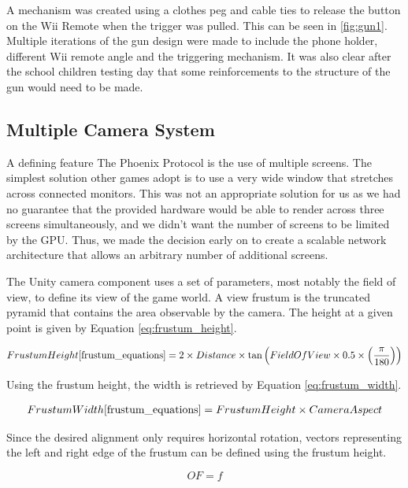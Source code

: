 \documentclass[a4paper,11pt]{article}
\begin{document}
A mechanism was created using a clothes peg and cable ties to release the button on the Wii Remote when the trigger was pulled. This can be seen in \ref{fig:gun1}. Multiple iterations of the gun design were made to include the phone holder, different Wii remote angle and the triggering mechanism. It was also clear after the school children testing day that some reinforcements to the structure of the gun would need to be made. 


\subsection{Multiple Camera System}
A defining feature The Phoenix Protocol is the use of multiple screens. The simplest solution other games adopt is to use a very wide window that stretches across connected monitors. This was not an appropriate solution for us as we had no guarantee that the provided hardware would be able to render across three screens simultaneously, and we didn't want the number of screens to be limited by the GPU. Thus, we made the decision early on to create a scalable network architecture that allows an arbitrary number of additional screens. 

The Unity camera component\cite{unity_camera} uses a set of parameters, most notably the field of view, to define its view of the game world. A view frustum \cite{unity_frustum} is the truncated pyramid that contains the area observable by the camera. The height at a given point is given by Equation \ref{eq:frustum_height}.

\begin{align}
	Frustum Height\cite{frustum_equations} = 2 \times Distance \times \tan \left( Field Of View \times 0.5 \times \left( \frac{\pi}{180} \right)\right)
    \label{eq:frustum_height}
\end{align}

Using the frustum height, the width is retrieved by Equation \ref{eq:frustum_width}.

\begin{align}
	Frustum Width\cite{frustum_equations} = Frustum Height \times Camera Aspect
    \label{eq:frustum_width}
\end{align}

Since the desired alignment only requires horizontal rotation, vectors representing the left and right edge of the frustum can be defined using the frustum height.

\begin{equation}
	OF = f
	\label{eq:origin_to_far}
\end{equation}
\end{document}
